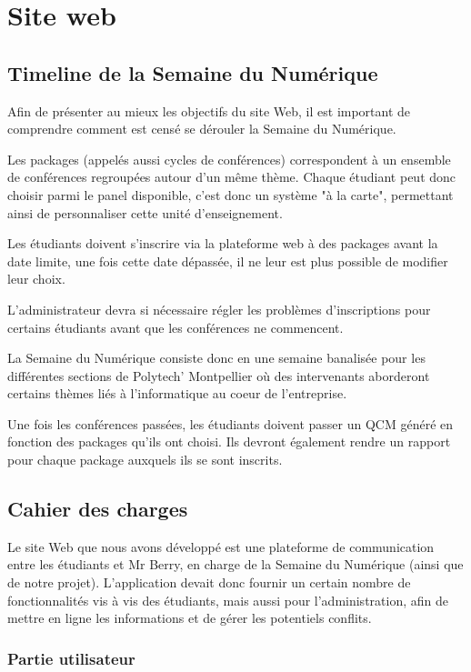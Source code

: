\chapter{Site web}

    \section{Timeline de la Semaine du Numérique}

Afin de présenter au mieux les objectifs du site Web, il est important de comprendre comment
est censé se dérouler la Semaine du Numérique.

Les packages (appelés aussi cycles de conférences) correspondent à un ensemble de conférences regroupées autour d'un même thème.
Chaque étudiant peut donc choisir parmi le panel disponible, c'est donc un système "à la carte", permettant
ainsi de personnaliser cette unité d'enseignement.

Les étudiants doivent s'inscrire via la plateforme web à des packages avant la date limite, une fois cette date dépassée,
il ne leur est plus possible de modifier leur choix.

L'administrateur devra si nécessaire régler les problèmes d'inscriptions pour certains étudiants avant que les conférences ne commencent.

La Semaine du Numérique consiste donc en une semaine banalisée pour les différentes sections de Polytech' Montpellier
où des intervenants aborderont certains thèmes liés à l'informatique au coeur de l'entreprise.

Une fois les conférences passées, les étudiants doivent passer un QCM généré en fonction des packages qu'ils ont choisi.
Ils devront également rendre un rapport pour chaque package auxquels ils se sont inscrits.

    \section{Cahier des charges}

Le site Web que nous avons développé est une plateforme de communication entre les étudiants
et Mr Berry, en charge de la Semaine du Numérique (ainsi que de notre projet).
L'application devait donc fournir un certain nombre de fonctionnalités vis à vis des étudiants,
mais aussi pour l'administration, afin de mettre en ligne les informations et de gérer les potentiels conflits.

        \subsection{Partie utilisateur}

